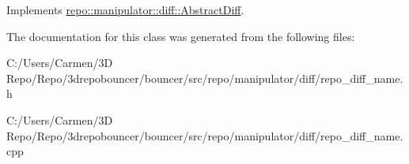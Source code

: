 Implements \hyperlink{classrepo_1_1manipulator_1_1diff_1_1_abstract_diff_a0c1780f099a434120e65835bd1514ebf}{repo\+::manipulator\+::diff\+::\+Abstract\+Diff}.



The documentation for this class was generated from the following files\+:\begin{DoxyCompactItemize}
\item 
C\+:/\+Users/\+Carmen/3\+D Repo/\+Repo/3drepobouncer/bouncer/src/repo/manipulator/diff/repo\+\_\+diff\+\_\+name.\+h\item 
C\+:/\+Users/\+Carmen/3\+D Repo/\+Repo/3drepobouncer/bouncer/src/repo/manipulator/diff/repo\+\_\+diff\+\_\+name.\+cpp\end{DoxyCompactItemize}
